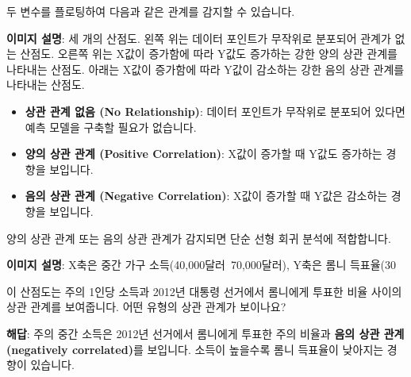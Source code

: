 \documentclass[11pt,a4paper]{book}
\theoremstyle{definition}
\begin{document}
\begin{tcolorbox}[infobox, title={가능한 선형 관계 (Possible Linear Relationships)}]
두 변수를 플로팅하여 다음과 같은 관계를 감지할 수 있습니다.
\begin{center}
\end{center}
\textbf{이미지 설명}: 세 개의 산점도. 왼쪽 위는 데이터 포인트가 무작위로 분포되어 관계가 없는 산점도. 오른쪽 위는 X값이 증가함에 따라 Y값도 증가하는 강한 양의 상관 관계를 나타내는 산점도. 아래는 X값이 증가함에 따라 Y값이 감소하는 강한 음의 상관 관계를 나타내는 산점도.

\begin{itemize}
    \item \textbf{상관 관계 없음 (No Relationship)}: 데이터 포인트가 무작위로 분포되어 있다면 예측 모델을 구축할 필요가 없습니다.
    \item \textbf{양의 상관 관계 (Positive Correlation)}: X값이 증가할 때 Y값도 증가하는 경향을 보입니다.
    \item \textbf{음의 상관 관계 (Negative Correlation)}: X값이 증가할 때 Y값은 감소하는 경향을 보입니다.
\end{itemize}
양의 상관 관계 또는 음의 상관 관계가 감지되면 단순 선형 회귀 분석에 적합합니다.
\end{tcolorbox}

\begin{tcolorbox}[examplebox, title={연습: 상관 관계 유형 파악하기}]
\begin{center}
\end{center}
\textbf{이미지 설명}: X축은 중간 가구 소득(40,000달러~70,000달러), Y축은 롬니 득표율(30%

이 산점도는 주의 1인당 소득과 2012년 대통령 선거에서 롬니에게 투표한 비율 사이의 상관 관계를 보여줍니다. 어떤 유형의 상관 관계가 보이나요?

\textbf{해답}: 주의 중간 소득은 2012년 선거에서 롬니에게 투표한 주의 비율과 \textbf{음의 상관 관계(negatively correlated)}를 보입니다. 소득이 높을수록 롬니 득표율이 낮아지는 경향이 있습니다.
\end{tcolorbox}
\end{document}
